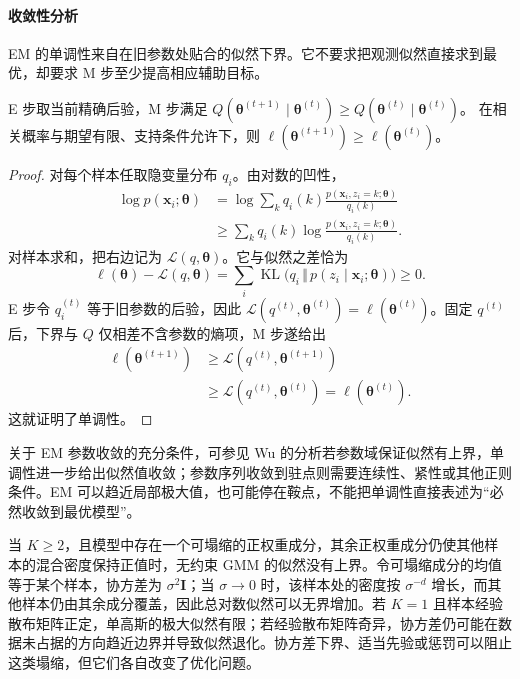 \paragraph{收敛性分析}
EM 的单调性来自在旧参数处贴合的似然下界。它不要求把观测似然直接求到最优，却要求 M 步至少提高相应辅助目标。

\begin{theorem}[EM 的似然单调性]
 \label{thm:clustering-em}
 E 步取当前精确后验，M 步满足
 $Q(\bm{\theta}^{(t+1)}\mid\bm{\theta}^{(t)})
 \geq Q(\bm{\theta}^{(t)}\mid\bm{\theta}^{(t)})$。
 在相关概率与期望有限、支持条件允许下，则
 $\ell(\bm{\theta}^{(t+1)})\geq\ell(\bm{\theta}^{(t)})$。
\end{theorem}
\begin{proof}
对每个样本任取隐变量分布 $q_i$。由对数的凹性，
\[
 \begin{aligned}
 \log p(\bm{x}_i;\bm{\theta})
 &=\log\sum_k q_i(k)
   \frac{p(\bm{x}_i,z_i=k;\bm{\theta})}{q_i(k)}\\
 &\geq\sum_kq_i(k)
   \log\frac{p(\bm{x}_i,z_i=k;\bm{\theta})}{q_i(k)}.
 \end{aligned}
\]
对样本求和，把右边记为 $\mathcal{L}(q,\bm{\theta})$。它与似然之差恰为
\[
 \ell(\bm{\theta})-\mathcal{L}(q,\bm{\theta})
 =\sum_i\operatorname{KL}
 \bigl(q_i\,\Vert\,p(z_i\mid\bm{x}_i;\bm{\theta})\bigr)
 \geq0.
\]
E 步令 $q_i^{(t)}$ 等于旧参数的后验，因此 $\mathcal{L}(q^{(t)},\bm{\theta}^{(t)})=\ell(\bm{\theta}^{(t)})$。固定 $q^{(t)}$ 后，下界与 $Q$ 仅相差不含参数的熵项，M 步遂给出
\[
 \begin{aligned}
 \ell(\bm{\theta}^{(t+1)})
 &\geq\mathcal{L}(q^{(t)},\bm{\theta}^{(t+1)})\\
 &\geq\mathcal{L}(q^{(t)},\bm{\theta}^{(t)})
 =\ell(\bm{\theta}^{(t)}).
 \end{aligned}
\]
这就证明了单调性。
\end{proof}

关于 EM 参数收敛的充分条件，可参见 Wu 的分析若参数域保证似然有上界，单调性进一步给出似然值收敛；参数序列收敛到驻点则需要连续性、紧性或其他正则条件。EM 可以趋近局部极大值，也可能停在鞍点，不能把单调性直接表述为“必然收敛到最优模型”。

当 $K\geq2$，且模型中存在一个可塌缩的正权重成分，其余正权重成分仍使其他样本的混合密度保持正值时，无约束 GMM 的似然没有上界。令可塌缩成分的均值等于某个样本，协方差为 $\sigma^2\bm{I}$；当 $\sigma\to0$ 时，该样本处的密度按 $\sigma^{-d}$ 增长，而其他样本仍由其余成分覆盖，因此总对数似然可以无界增加。若 $K=1$ 且样本经验散布矩阵正定，单高斯的极大似然有限；若经验散布矩阵奇异，协方差仍可能在数据未占据的方向趋近边界并导致似然退化。协方差下界、适当先验或惩罚可以阻止这类塌缩，但它们各自改变了优化问题。

